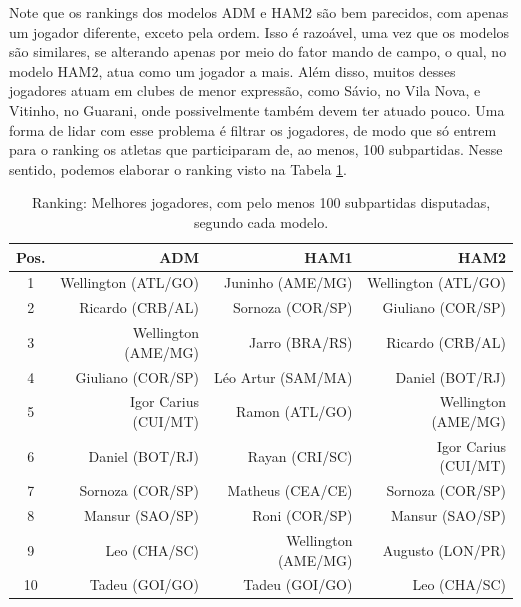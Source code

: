 Note que os rankings dos modelos ADM e HAM2 são bem parecidos, com apenas um jogador diferente, exceto pela ordem. Isso é razoável, uma vez que os modelos são similares, se alterando apenas por meio do fator mando de campo, o qual, no modelo HAM2, atua como um jogador a mais. Além disso, muitos desses jogadores atuam em clubes de menor expressão, como Sávio, no Vila Nova, e Vitinho, no Guarani, onde possivelmente também devem ter atuado pouco. Uma forma de lidar com esse problema é filtrar os jogadores, de modo que só entrem para o ranking os atletas que participaram de, ao menos, 100 subpartidas. Nesse sentido, podemos elaborar o ranking visto na Tabela \ref{ranking2}.
\begin{table}[H]
    \centering
    \begin{tabular}{c|rrr}
        \hline
        Pos. & ADM                  & HAM1                & HAM2                 \\ \hline
        1    & Wellington (ATL/GO)  & Juninho (AME/MG)    & Wellington (ATL/GO)  \\
        2    & Ricardo (CRB/AL)     & Sornoza (COR/SP)    & Giuliano (COR/SP)    \\
        3    & Wellington (AME/MG)  & Jarro (BRA/RS)      & Ricardo (CRB/AL)     \\
        4    & Giuliano (COR/SP)    & Léo Artur (SAM/MA)  & Daniel (BOT/RJ)      \\
        5    & Igor Carius (CUI/MT) & Ramon (ATL/GO)      & Wellington (AME/MG)  \\
        6    & Daniel (BOT/RJ)      & Rayan (CRI/SC)      & Igor Carius (CUI/MT) \\
        7    & Sornoza (COR/SP)     & Matheus (CEA/CE)    & Sornoza (COR/SP)     \\
        8    & Mansur (SAO/SP)      & Roni (COR/SP)       & Mansur (SAO/SP)      \\
        9    & Leo (CHA/SC)         & Wellington (AME/MG) & Augusto (LON/PR)     \\
        10   & Tadeu (GOI/GO)       & Tadeu (GOI/GO)      & Leo (CHA/SC)         \\ \hline
    \end{tabular}
    \caption{Ranking: Melhores jogadores, com pelo menos 100 subpartidas disputadas, segundo cada modelo.}
    \label{ranking2}
\end{table}


